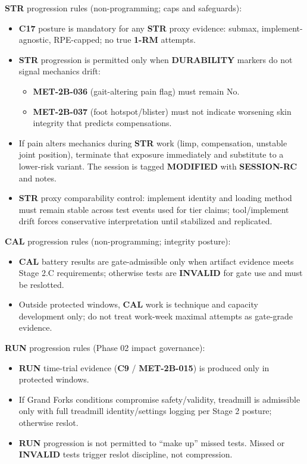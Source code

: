 \documentclass[10pt]{article}
\begin{document}
\begin{landscape}
\textbf{STR} progression rules (non-programming; caps and safeguards):

\begin{itemize}
\item \textbf{C17} posture is mandatory for any \textbf{STR} proxy evidence: submax, implement-agnostic, RPE-capped; no true \textbf{1-RM} attempts.
\item \textbf{STR} progression is permitted only when \textbf{DURABILITY} markers do not signal mechanics drift:
\begin{itemize}
\item \textbf{MET-2B-036} (gait-altering pain flag) must remain No.
\item \textbf{MET-2B-037} (foot hotspot/blister) must not indicate worsening skin integrity that predicts compensations.
\end{itemize}
\item If pain alters mechanics during \textbf{STR} work (limp, compensation, unstable joint position), terminate that exposure immediately and substitute to a lower-risk variant. The session is tagged \textbf{MODIFIED} with \textbf{SESSION-RC} and notes.
\item \textbf{STR} proxy comparability control: implement identity and loading method must remain stable across test events used for tier claims; tool/implement drift forces conservative interpretation until stabilized and replicated.
\end{itemize}

\textbf{CAL} progression rules (non-programming; integrity posture):

\begin{itemize}
\item \textbf{CAL} battery results are gate-admissible only when artifact evidence meets Stage 2.C requirements; otherwise tests are \textbf{INVALID} for gate use and must be reslotted.
\item Outside protected windows, \textbf{CAL} work is technique and capacity development only; do not treat work-week maximal attempts as gate-grade evidence.
\end{itemize}

\textbf{RUN} progression rules (Phase 02 impact governance):

\begin{itemize}
\item \textbf{RUN} time-trial evidence (\textbf{C9} / \textbf{MET-2B-015}) is produced only in protected windows.
\item If Grand Forks conditions compromise safety/validity, treadmill is admissible only with full treadmill identity/settings logging per Stage 2 posture; otherwise reslot.
\item \textbf{RUN} progression is not permitted to “make up” missed tests. Missed or \textbf{INVALID} tests trigger reslot discipline, not compression.
\end{itemize}


\end{landscape}
\end{document}
